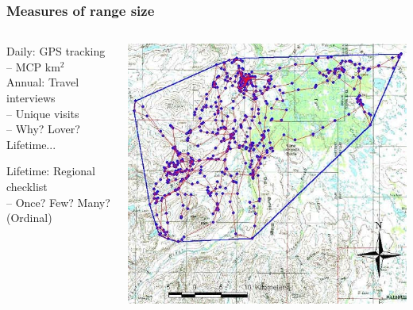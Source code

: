 \documentclass{beamer}
\begin{document}

\begin{frame}
\frametitle{Measures of range size}

\begin{columns}
\begin{column}{.5\textwidth}
Daily: GPS tracking \\
-- MCP km$^{2}$ \\

\vspace{0.75cm}
Annual: Travel interviews \\
-- Unique visits \\
-- Why? Lover? \\

\vspace{0.75cm}
Lifetime...

\vspace{0.75cm}
Lifetime: Regional checklist \\
-- Once? Few? Many? (Ordinal)
\end{column}

\begin{column}{.5\textwidth}
\includegraphics[width= 1\textwidth]{MCP}
\end{column}

\end{columns}

\end{frame}
\end{document}
